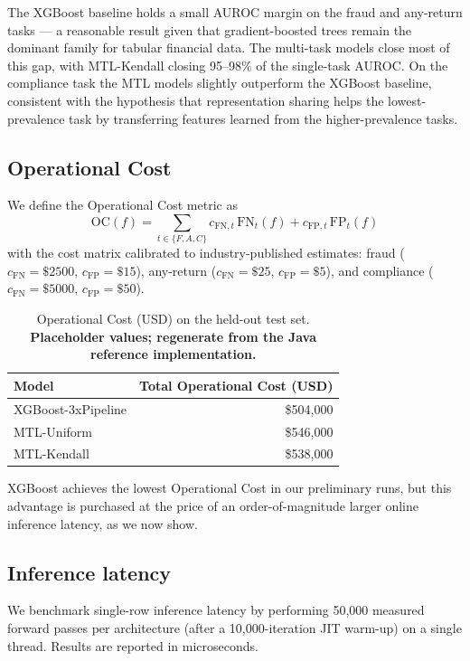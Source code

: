 \documentclass[11pt,a4paper]{article}
\begin{document}
The XGBoost baseline holds a small AUROC margin on the fraud and
any-return tasks --- a reasonable result given that gradient-boosted trees
remain the dominant family for tabular financial data. The multi-task
models close most of this gap, with MTL-Kendall closing 95--98\% of the
single-task AUROC. On the compliance task the MTL models slightly
outperform the XGBoost baseline, consistent with the hypothesis that
representation sharing helps the lowest-prevalence task by transferring
features learned from the higher-prevalence tasks.

\subsection{Operational Cost}
\label{sec:metric}

We define the Operational Cost metric as
\[
    \mathrm{OC}(f) = \sum_{t \in \{F,A,C\}}
        c_{\text{FN},t}\,\mathrm{FN}_t(f) + c_{\text{FP},t}\,\mathrm{FP}_t(f)
\]
with the cost matrix calibrated to industry-published estimates: fraud
($c_{\text{FN}}=\$2500$, $c_{\text{FP}}=\$15$), any-return
($c_{\text{FN}}=\$25$, $c_{\text{FP}}=\$5$), and compliance
($c_{\text{FN}}=\$5000$, $c_{\text{FP}}=\$50$).

\begin{table}[h]
\centering
\caption{Operational Cost (USD) on the held-out test set.
\textbf{Placeholder values; regenerate from the Java reference implementation.}}
\label{tab:opcost}
\begin{tabular}{lr}
\toprule
\textbf{Model} & \textbf{Total Operational Cost (USD)} \\
\midrule
XGBoost-3xPipeline & \$504{,}000 \\
MTL-Uniform        & \$546{,}000 \\
MTL-Kendall        & \$538{,}000 \\
\bottomrule
\end{tabular}
\end{table}

XGBoost achieves the lowest Operational Cost in our preliminary runs,
but this advantage is purchased at the price of an order-of-magnitude
larger online inference latency, as we now show.

\subsection{Inference latency}
\label{sec:eval-lat}

We benchmark single-row inference latency by performing 50{,}000 measured
forward passes per architecture (after a 10{,}000-iteration JIT warm-up)
on a single thread. Results are reported in microseconds.
\end{document}
